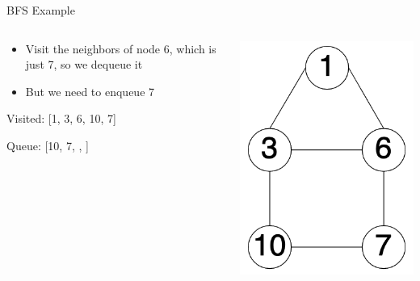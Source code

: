 \documentclass[
  ignorenonframetext,
]{beamer}
\begin{document}
\begin{frame}{BFS Example}
\protect\hypertarget{bfs-example-4}{}
\begin{columns}[T]
\begin{column}{0.6\textwidth}
\begin{itemize}
\item
  Visit the neighbors of node 6, which is just 7, so we dequeue it
\item
  But we need to enqueue 7 \vspace{1cm}
\end{itemize}

Visited: {[}1, 3, 6, 10, 7{]}

Queue: {[}10, 7, , {]}
\end{column}

\begin{column}{0.4\textwidth}
\includegraphics{images/graph-bfs.png}
\end{column}
\end{columns}
\end{frame}
\end{document}
